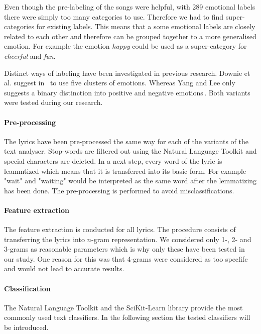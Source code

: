 \documentclass[a4paper,12pt]{article}
\begin{document}
Even though the pre-labeling of the songs were helpful, with 289 emotional labels there were simply too many categories to use. Therefore we had to find super-categories for existing labels. This means that a some emotional labels are closely related to each other and therefore can be grouped together to a more generalised emotion. For example the emotion \textit{happy} could be used as a super-category for \textit{cheerful} and \textit{fun}.

Distinct ways of labeling have been investigated in previous research. Downie et al. suggest in \,\cite{downie20082007}  to use five clusters of emotions. Whereas Yang and Lee only suggests a binary distinction into positive and negative emotions\,\cite{yang2009music}. Both variants were tested during our research.

\paragraph{Pre-processing} The lyrics have been pre-processed the same way for each of the variants of the text analyser. Stop-words are filtered out using the Natural Language Toolkit and special characters are deleted. In a next step, every word of the lyric is leammtized which means that it is transferred into its basic form. For example "wait" and "waiting" would be interpreted as the same word after the lemmatizing has been done. The pre-processing is performed to avoid misclassifications. 

\paragraph{Feature extraction} The feature extraction is conducted for all lyrics. The procedure consists of transferring the lyrics into $n$-gram representation. We considered only 1-, 2- and 3-grams as reasonable parameters which is why only these have been tested in our study. One reason for this was that 4-grams were considered as too specfifc and would not lead to accurate results.

\paragraph{Classification} The Natural Language Toolkit and the SciKit-Learn library provide the most commonly used text classifiers. In the following section the tested classifiers will be introduced. 
\end{document}
